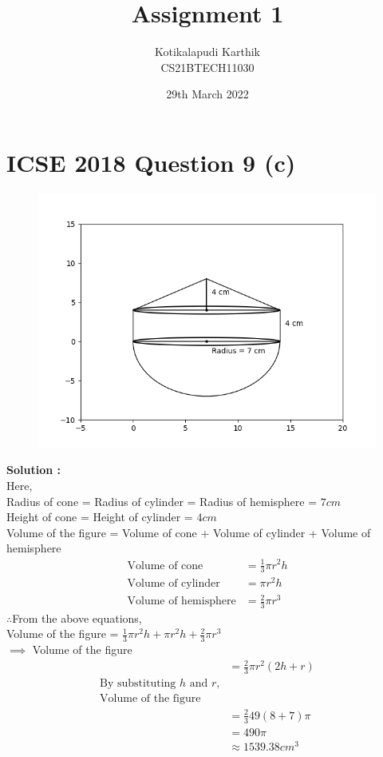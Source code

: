\documentclass[journal,12pt,twocolumn]{IEEEtran}
\title{Assignment 1}
\author{Kotikalapudi Karthik \\
CS21BTECH11030}
\date{29th March 2022}
\begin{document}
\maketitle

\section*{ICSE 2018 Question 9 (c)}
\begin{figure}[ht!]
	  \centering 
	  \includegraphics[width=\columnwidth]{question9c.png}
\end{figure}
\textbf{Solution :}\\
Here,\\
Radius of cone = Radius of cylinder = Radius of hemisphere = $7cm$\\
Height of cone = Height of cylinder = $4cm$\\
Volume of the figure = Volume of cone + Volume of cylinder + Volume of hemisphere
\begin{align}
    \text{Volume of cone} &= \frac{1}{3} \pi r^2 h
    \\
    \text{Volume of cylinder} &= \pi r^2 h
    \\
    \text{Volume of hemisphere} &= \frac{2}{3} \pi r^3
\end{align}
$\therefore$From the above equations,\\
Volume of the figure = $\frac{1}{3} \pi r^2 h + \pi r^2 h + \frac{2}{3} \pi r^3$\\
$\implies$ Volume of the figure
\begin{align*}
    &= \frac{2}{3} \pi r^2 (2h+r)\\
    \text{By substituting $h$ and $r$,}\\
    \text{Volume of the figure}\\
    &= \frac{2}{3} 49 (8+7) \pi\\
    &= 490 \pi\\ 
    &\approx 1539.38cm^3
\end{align*}
\end{document}
